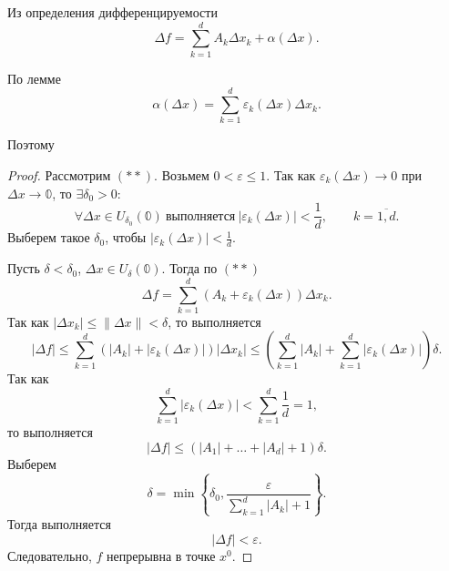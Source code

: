 \documentclass[12pt,a4paper]{report}
\begin{document}
Из определения дифференцируемости
\[
\Delta f=\sum_{k=1}^d A_k\Delta x_k+\alpha(\Delta x).
\]

По лемме
\[
\alpha(\Delta x)=\sum_{k=1}^d\varepsilon_k(\Delta x)\Delta x_k.
\]

Поэтому


\begin{proof}
    Рассмотрим $(**)$. Возьмем $0<\varepsilon\leq1$. Так как $\varepsilon_k(\Delta x)\to0$ при $\Delta x\to\mathbb 0$, то $\exists\delta_0>0\colon$
    \[
    \forall \Delta x\in U_{\delta_0}(\mathbb 0) \ \text{выполняется} \ |\varepsilon_k(\Delta x)|<\frac{1}{d}, \qquad k=\overline{1,d}.
    \]
    Выберем такое $\delta_0$, чтобы $|\varepsilon_k(\Delta x)|<\frac{1}{d}$.

    Пусть $\delta<\delta_0$, $\Delta x\in U_\delta(\mathbb 0)$. Тогда по $(**)$
    \[
    \Delta f=\sum_{k=1}^d\left(A_k+\varepsilon_k(\Delta x)\right)\Delta x_k.
    \]
    Так как $|\Delta x_k|\leq\|\Delta x\|<\delta$, то выполняется
    \[
    |\Delta f|
    \leq\sum_{k=1}^d\left(|A_k|+|\varepsilon_k(\Delta x)|\right)|\Delta x_k|
    \leq\left(\sum_{k=1}^d|A_k|+\sum_{k=1}^d|\varepsilon_k(\Delta x)|\right)\delta.
    \]
    Так как
    \[
    \sum_{k=1}^d|\varepsilon_k(\Delta x)|<\sum_{k=1}^d\frac{1}{d}=1,
    \]
    то выполняется
    \[
    |\Delta f|\leq\left(|A_1|+\dots+|A_d|+1\right)\delta.
    \]
    Выберем
    \[
    \delta=\min\left\{\delta_0,\frac{\varepsilon}{\sum_{k=1}^d|A_k|+1}\right\}.
    \]
    Тогда выполняется
    \[
    |\Delta f|<\varepsilon.
    \]
    Следовательно, $f$ непрерывна в точке $x^0$.
\end{proof}


\end{document}
